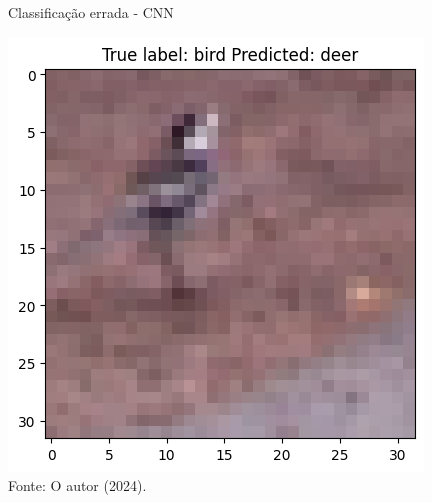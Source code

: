 \begin{figure}[H]
\centering
\caption{Classificação errada - CNN}
\includegraphics[width=.8\linewidth]{apendices/fig/9_IAA009_4.png}
\caption*{Fonte: O autor (2024).}
\end{figure}

